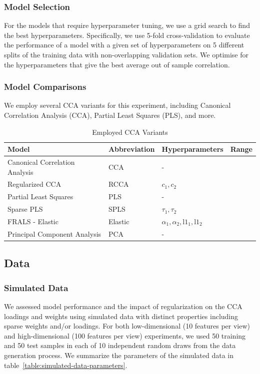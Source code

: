 \subsubsection{Model Selection}

For the models that require hyperparameter tuning, we use a grid search to find the best hyperparameters.
Specifically, we use 5-fold cross-validation to evaluate the performance of a model with a given set of hyperparameters on 5 different splits of the training data with non-overlapping validation sets.
We optimise for the hyperparameters that give the best average out of sample correlation.

\subsubsection{Model Comparisons}
We employ several CCA variants for this experiment, including Canonical Correlation Analysis (CCA), Partial Least Squares (PLS), and more.

\begin{table}[h]
\centering
\caption{Employed CCA Variants}
\begin{tabular}{|l|l|l|l|}
\hline
\textbf{Model} & \textbf{Abbreviation} & \textbf{Hyperparameters} & \textbf{Range} \\
\hline
Canonical Correlation Analysis & CCA & - &  \\
\hline
Regularized CCA & RCCA & \(c_1, c_2\) &  \\
\hline
Partial Least Squares & PLS & - &  \\
\hline
Sparse PLS & SPLS & \(\tau_1, \tau_2\) &  \\
\hline
FRALS - Elastic & Elastic & \(\alpha_1, \alpha_2, \text{l1}_1, \text{l1}_2\) &  \\
\hline
Principal Component Analysis & PCA & - & \\
\hline
\end{tabular}\label{table:cca-variants}
\end{table}

\subsection{Data}

\subsubsection{Simulated Data}

We assessed model performance and the impact of regularization on the CCA loadings and weights using simulated data with distinct properties including sparse weights and/or loadings.
For both low-dimensional (10 features per view) and high-dimensional (100 features per view) experiments, we used 50 training and 50 test samples in each of 10 independent random draws from the data generation process.
We summarize the parameters of the simulated data in table~\ref{table:simulated-data-parameters}.

